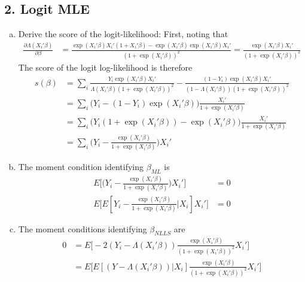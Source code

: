 \documentclass[11pt]{article}
\begin{document}
\begin{center}
\end{center}

\subsection*{2. Logit MLE}

\begin{enumerate}[a)]

	\item Derive the score of the logit-likelihood:
	First, noting that
	\begin{align*}
		\frac{\partial \Lambda(X_i'\beta)}{\partial \beta} &= \frac{\exp(X_i' \beta)X_i'(1 + X_i'\beta) - \exp(X_i'\beta) \exp(X_i'\beta) X_i'}{(1+\exp(X_i'\beta))^2} = \frac{\exp(X_i'\beta)X_i'}{(1 + \exp(X_i'\beta))^2}
	\end{align*}
	The score of the logit log-likelihood is therefore
	\begin{align*}
		s(\beta) &= \sum_i \frac{Y_i \exp(X_i'\beta)X_i' }{\Lambda(X_i'\beta)(1 + \exp(X_i'\beta))^2} -
			\frac{(1 - Y_i)\exp(X_i'\beta)X_i'}{(1 - \Lambda(X_i'\beta))(1 + \exp(X_i'\beta))^2} \\
		&= \sum_i \Big( Y_i - (1 - Y_i)\exp(X_i'\beta) \Big) \frac{X_i'}{1 + \exp(X_i'\beta)}\\
		&= \sum_i \Big( Y_i(1 + \exp(X_i'\beta)) - \exp(X_i'\beta) \Big) \frac{X_i'}{1 + \exp(X_i'\beta)} \\
		&= \sum_i \Big( Y_i - \frac{\exp(X_i'\beta)}{1 + \exp(X_i'\beta)} \Big) X_i'
	\end{align*}
	
	\item The moment condition identifying $\beta_{ML}$ is
	\begin{align*}
		E \bigg[ \Big( Y_i - \frac{\exp(X_i'\beta)}{1 + \exp(X_i'\beta)}\Big) X_i' \bigg] &= 0 \\
		E \bigg[ E[Y_i - \frac{\exp(X_i'\beta)}{1 + \exp(X_i'\beta)} | X_i] X_i' \bigg] &= 0
	\end{align*}
	
	\item The moment conditions identifying $\beta_{NLLS}$ are
	\begin{align*}
		0 &= E \bigg[ -2 (Y_i - \Lambda(X_i'\beta)) \frac{\exp(X_i'\beta)}{(1 + \exp(X_i'\beta))^2} X_i' \bigg] \\
		&= E \bigg[ E[(Y - \Lambda(X_i'\beta)) | X_i] \frac{\exp(X_i'\beta)}{(1 + \exp(X_i'\beta))^2} X_i' \bigg] \\
	\end{align*}


\end{enumerate}
\end{document}
